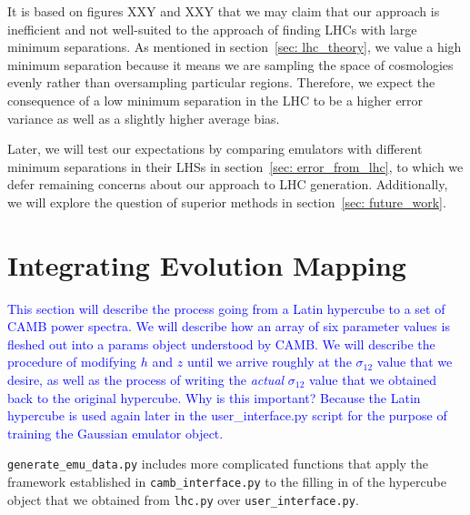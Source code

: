 It is based on figures XXY and XXY that we may claim that our approach is
inefficient and not well-suited to the approach of finding LHCs with large
minimum separations. As mentioned in section~\ref{sec: lhc_theory},
we value a high minimum separation because it means we are sampling the
space of cosmologies evenly rather than oversampling particular regions.
Therefore, we expect the consequence of a low minimum separation in the LHC to
be a higher error variance as well as a slightly higher average bias.


Later, we will test our expectations by comparing emulators with different
minimum separations in their LHSs in section~\ref{sec: error_from_lhc}, to
which we defer remaining concerns about our approach to LHC generation.
Additionally, we will explore the question of superior methods in
section~\ref{sec: future_work}.

\section{Integrating Evolution Mapping}
\label{sec: generate_emu_data}


\textcolor{blue}{This section will describe the process going from a Latin 
hypercube to a set of CAMB power spectra. We will describe how an array of six 
parameter values is fleshed out into a params object understood by CAMB. We 
will describe the procedure of modifying $h$ and $z$ until we arrive roughly 
at the $\sigma_{12}$ value that we desire, as well as the process of writing 
the \textit{actual} $\sigma_{12}$ value that we obtained back to the original 
hypercube. Why is this important? Because the Latin hypercube is used again 
later in the user\_interface.py script for the purpose of training the 
Gaussian emulator object.}

\verb|generate_emu_data.py| includes more complicated functions that apply the 
framework established in \verb|camb_interface.py| to the filling in of the 
hypercube object that we obtained from \verb|lhc.py| over
\verb|user_interface.py|.

